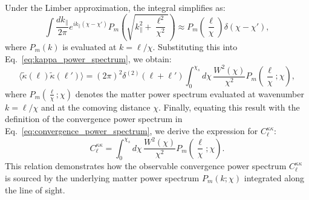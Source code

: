 Under the Limber approximation, the integral simplifies as:
\begin{equation}
    \int \frac{dk_\parallel}{2\pi} e^{i k_\parallel (\chi - \chi')} P_m\left(\sqrt{k_\parallel^2 + \frac{\ell^2}{\chi^2}}\right) \approx P_m\left(\frac{\ell}{\chi}\right) \delta(\chi - \chi'),
    \label{eq:limber_approximation}
\end{equation}
where \( P_m(k) \) is evaluated at \( k = \ell/\chi \).
Substituting this into Eq.~\eqref{eq:kappa_power_spectrum}, we obtain:
\begin{equation}
    \langle \tilde{\kappa}(\boldsymbol{\ell}) \tilde{\kappa}(\boldsymbol{\ell}') \rangle = (2\pi)^2 \delta^{(2)}(\boldsymbol{\ell} + \boldsymbol{\ell}') \int_0^{\chi_s} d\chi \, \frac{W^2(\chi)}{\chi^2} P_m\left(\frac{\ell}{\chi}; \chi\right),
    \label{eq:kappa_power_spectrum_final}
\end{equation}
where \( P_m\left(\frac{\ell}{\chi}; \chi\right) \) denotes the matter power spectrum evaluated at wavenumber \( k = \ell/\chi \) and at the comoving distance \( \chi \).
Finally, equating this result with the definition of the convergence power spectrum in Eq.~\eqref{eq:convergence_power_spectrum}, we derive the expression for \( C_{\ell}^{\kappa\kappa} \):
\begin{equation}
    C_{\ell}^{\kappa\kappa} = \int_0^{\chi_s} d\chi \, \frac{W^2(\chi)}{\chi^2} P_m\left(\frac{\ell}{\chi}; \chi\right).
    \label{eq:convergence_power_spectrum_final}
\end{equation}
This relation demonstrates how the observable convergence power spectrum \( C_{\ell}^{\kappa\kappa} \) is sourced by the underlying matter power spectrum \( P_m(k; \chi) \) integrated along the line of sight.

